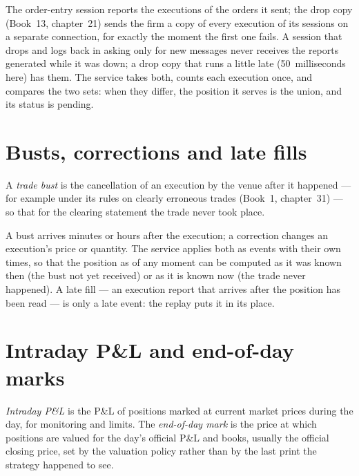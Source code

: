 The order-entry session reports the executions of the orders it sent; the drop copy (Book~13, chapter~21) sends the firm a copy of every
execution of its sessions on a separate connection, for exactly the moment the first one fails. A session that drops and logs back in asking
only for new messages never receives the reports generated while it was down; a drop copy that runs a little late (50~milliseconds here) has
them. The service takes both, counts each execution once, and compares the two sets: when they differ, the position it serves is the union,
and its status is pending.

\label{lst:pl:position-and-pnl-services:status}

\section{Busts, corrections and late fills}

\begin{definition}\label{def:pl:position-and-pnl-services:bust}
A \emph{trade bust} is the cancellation of an execution by the venue after it happened --- for example under its rules on
clearly erroneous trades (Book~1, chapter~31) --- so that for the clearing statement the trade never took place.
\end{definition}

A bust arrives minutes or hours after the execution; a correction changes an execution's price or quantity. The service applies both as
events with their own times, so that the position as of any moment can be computed as it was known then (the bust not yet received) or as it
is known now (the trade never happened). A late fill --- an execution report that arrives after the position has been read --- is only a late
event: the replay puts it in its place.

\section{Intraday P\&L and end-of-day marks}

\begin{definition}\label{def:pl:position-and-pnl-services:marks}
\emph{Intraday P\&L} is the P\&L of positions marked at current market prices during the day, for monitoring and limits.
The \emph{end-of-day mark} is the price at which positions are valued for the day's official P\&L and books, usually
the official closing price, set by the valuation policy rather than by the last print the strategy happened to see.
\end{definition}

